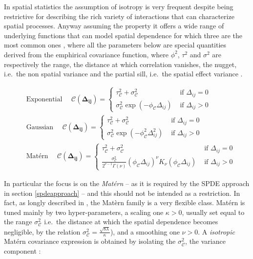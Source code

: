 \documentclass[
  12pt,
  a4paper,
  oneside]{book}
\theoremstyle{definition}
\theoremstyle{definition}
\theoremstyle{definition}
\theoremstyle{remark}
\begin{document}
In spatial statistics the assumption of isotropy is very frequent despite being restrictive for describing the rich variety of interactions that can characterize spatial processes. Anyway assuming the property it offers a wide range of underlying functions that can model spatial dependence for which three are the most common ones \citep{Krainski2018}, where all the parameters below are special quantities derived from the emphirical covariance function, where \(\phi^2\), \(\tau^2\) and \(\sigma^2\) are respectively the range, the distance at which correlation vanishes, the nugget, i.e.~the non spatial variance and the partial sill, i.e.~the spatial effect variance \citep{LecturePaci}.

\[
\begin{aligned}
&\text { Exponential } \quad \mathscr{C}(\mathbf{ \Delta_{i j}})=\left\{\begin{array}{cl}
\tau^{2}_{\mathscr{C}}+\sigma^{2}_{\mathscr{C}} & \text { if }  \Delta_{i j}=0 \\
\sigma^{2}_{\mathscr{C}} \exp (-\phi_{\mathscr{C}} \Delta_{i j}) & \text { if } \Delta_{i j}>0 
\end{array}\right.\\
&\text { Gaussian } \quad \mathscr{C}(\mathbf{ \Delta_{i j}})=\left\{\begin{array}{cl}
\tau^{2}_{\mathscr{C}}+\sigma^{2}_{\mathscr{C}} & \text { if } \Delta_{i j}=0 \\
\sigma^{2}_{\mathscr{C}} \exp \left(-\phi^{2}_{\mathscr{C}}  \Delta_{i j}^{2}\right) & \text { if } \Delta_{i j}>0 
\end{array}\right. \\
&\text { Matérn } \quad \mathscr{C}(\mathbf{ \Delta_{i j}})=\left\{\begin{array}{cl}
\tau^{2}_{\mathscr{C}}+\sigma^{2}_{\mathscr{C}} & \text { if } \Delta_{i j}=0 \\
\frac{\sigma^{2}_{\mathscr{C}}}{2^{\nu-1} \Gamma(\nu)}(\phi_{\mathscr{C}}  \Delta_{i j})^{\nu} K_{\nu}(\phi_{\mathscr{C}}  \Delta_{i j}) & \text { if } \Delta_{i j}>0
\end{array}\right.
\end{aligned}
\]

In particular the focus is on the \emph{Matérn} -- as it is required by the SPDE approach in section \ref{spdeapproach} -- and this should not be intended as a restriction. In fact, as longly described in \citet{gneiting2006geostatistical}, the Matèrn family is a very flexible class. Matérn is tuned mainly by two hyper-parameters, a scaling one \(\kappa>0\), usually set equal to the range \(\sigma_{\mathscr{C}}^{2}\) i.e.~the distance at which the spatial dependence becomes negligible, by the relation \(\sigma_{\mathscr{C}}^{2}=\frac{\sqrt{8 \lambda}}{\kappa}\)), and a smoothing one \(\nu>0\). A \emph{isotropic} Matérn covariance expression is obtained by isolating the \(\sigma_{\mathscr{C}}^{2}\), the variance component \citep{Cressie_2015}:
\end{document}
